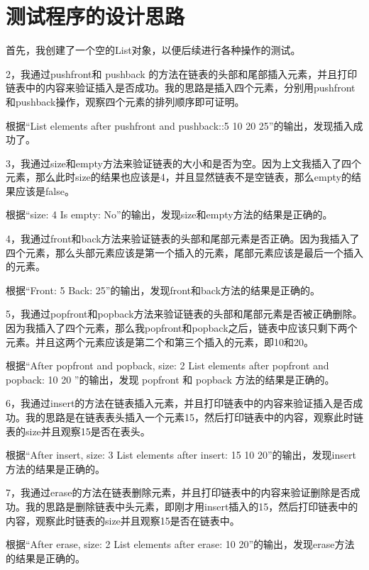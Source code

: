 \documentclass[UTF8]{ctexart}
\begin{document}
\pagestyle{fancy}
\fancyhead{}

\section{测试程序的设计思路}

首先，我创建了一个空的List对象，以便后续进行各种操作的测试。

2，我通过pushfront和 pushback 的方法在链表的头部和尾部插入元素，并且打印链表中的内容来验证插入是否成功。我的思路是插入四个元素，分别用pushfront和pushback操作，观察四个元素的排列顺序即可证明。

根据“List elements after pushfront and pushback::5 10 20 25”的输出，发现插入成功了。

3，我通过size和empty方法来验证链表的大小和是否为空。因为上文我插入了四个元素，那么此时size的结果也应该是4，并且显然链表不是空链表，那么empty的结果应该是false。

根据“size: 4  Is empty: No”的输出，发现size和empty方法的结果是正确的。

4，我通过front和back方法来验证链表的头部和尾部元素是否正确。因为我插入了四个元素，那么头部元素应该是第一个插入的元素，尾部元素应该是最后一个插入的元素。

根据“Front: 5  Back: 25”的输出，发现front和back方法的结果是正确的。

5，我通过popfront和popback方法来验证链表的头部和尾部元素是否被正确删除。因为我插入了四个元素，那么我popfront和popback之后，链表中应该只剩下两个元素。并且这两个元素应该是第二个和第三个插入的元素，即10和20。

根据“After popfront and popback, size: 2  List elements after popfront and popback: 10 20 ”的输出，发现 popfront 和 popback 方法的结果是正确的。

6，我通过insert的方法在链表插入元素，并且打印链表中的内容来验证插入是否成功。我的思路是在链表表头插入一个元素15，然后打印链表中的内容，观察此时链表的size并且观察15是否在表头。

根据“After insert, size: 3  List elements after insert: 15 10 20”的输出，发现insert方法的结果是正确的。

7，我通过erase的方法在链表删除元素，并且打印链表中的内容来验证删除是否成功。我的思路是删除链表中头元素，即刚才用insert插入的15，然后打印链表中的内容，观察此时链表的size并且观察15是否在链表中。

根据“After erase, size: 2  List elements after erase: 10 20”的输出，发现erase方法的结果是正确的。
\end{document}
